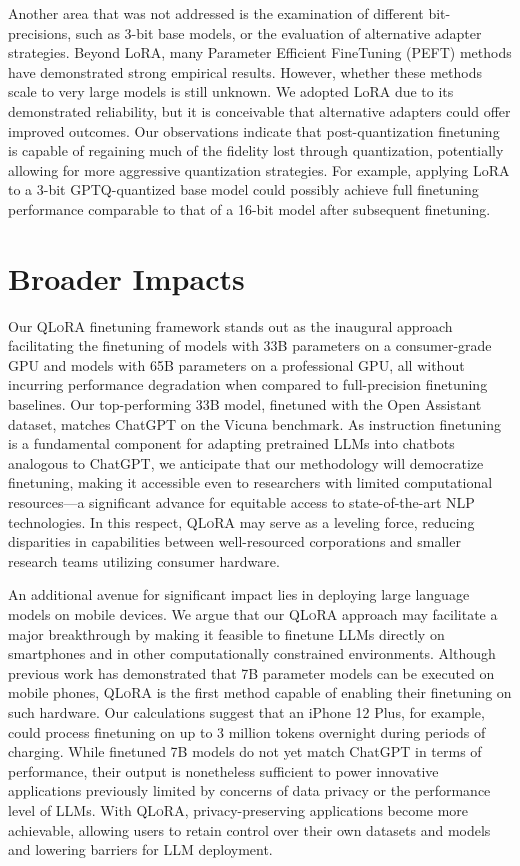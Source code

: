Another area that was not addressed is the examination of different bit-precisions, such as 3-bit base models, or the evaluation of alternative adapter strategies. Beyond LoRA, many Parameter Efficient FineTuning (PEFT) methods have demonstrated strong empirical results. However, whether these methods scale to very large models is still unknown. We adopted LoRA due to its demonstrated reliability, but it is conceivable that alternative adapters could offer improved outcomes. Our observations indicate that post-quantization finetuning is capable of regaining much of the fidelity lost through quantization, potentially allowing for more aggressive quantization strategies. For example, applying LoRA to a 3-bit GPTQ-quantized base model could possibly achieve full finetuning performance comparable to that of a 16-bit model after subsequent finetuning.

\section{Broader Impacts}

Our \textsc{QLoRA} finetuning framework stands out as the inaugural approach facilitating the finetuning of models with 33B parameters on a consumer-grade GPU and models with 65B parameters on a professional GPU, all without incurring performance degradation when compared to full-precision finetuning baselines. Our top-performing 33B model, finetuned with the Open Assistant dataset, matches ChatGPT on the Vicuna benchmark. As instruction finetuning is a fundamental component for adapting pretrained LLMs into chatbots analogous to ChatGPT, we anticipate that our methodology will democratize finetuning, making it accessible even to researchers with limited computational resources—a significant advance for equitable access to state-of-the-art NLP technologies. In this respect, \textsc{QLoRA} may serve as a leveling force, reducing disparities in capabilities between well-resourced corporations and smaller research teams utilizing consumer hardware.

An additional avenue for significant impact lies in deploying large language models on mobile devices. We argue that our \textsc{QLoRA} approach may facilitate a major breakthrough by making it feasible to finetune LLMs directly on smartphones and in other computationally constrained environments. Although previous work has demonstrated that 7B parameter models can be executed on mobile phones, \textsc{QLoRA} is the first method capable of enabling their finetuning on such hardware. Our calculations suggest that an iPhone 12 Plus, for example, could process finetuning on up to 3 million tokens overnight during periods of charging. While finetuned 7B models do not yet match ChatGPT in terms of performance, their output is nonetheless sufficient to power innovative applications previously limited by concerns of data privacy or the performance level of LLMs. With \textsc{QLoRA}, privacy-preserving applications become more achievable, allowing users to retain control over their own datasets and models and lowering barriers for LLM deployment.


